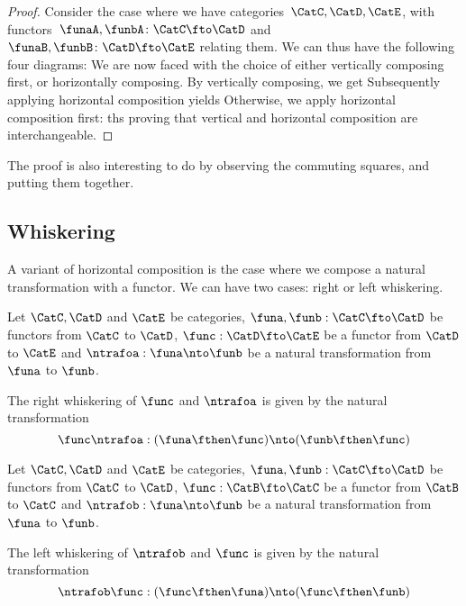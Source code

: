 \begin{proof}
    Consider the case where we have categories~$\CatC, \CatD, \CatE$, with functors~$\funaA, \funbA\colon\CatC \fto \CatD$ and~$\funaB, \funbB\colon\CatD \fto \CatE$ relating them.
    We can thus have the following four diagrams:
    We are now faced with the choice of either vertically composing first, or horizontally composing.
    By vertically composing, we get
    Subsequently applying horizontal composition yields
    Otherwise, we apply horizontal composition first:
    ths proving that vertical and horizontal composition are interchangeable.
\end{proof}

\begin{remark}
    The proof is also interesting to do by observing the commuting squares, and putting them together.
\end{remark}
\subsection{Whiskering}
A variant of horizontal composition is the case where we compose a natural transformation with a functor.
We can have two cases:
right or left whiskering.


\begin{ctdefinition}
    Let $\CatC, \CatD$ and $\CatE$ be categories, $\funa, \funb: \CatC \fto \CatD$ be functors from $\CatC$ to $\CatD$, $\func:\CatD \fto \CatE$ be a functor
    from $\CatD$ to $\CatE$ and $\ntrafoa:\funa \nto \funb$ be a natural transformation from $\funa$ to $\funb$.

    The right whiskering of $\func$ and $\ntrafoa$ is given by the natural transformation
    \begin{equation}
        \func \ntrafoa : (\funa\fthen\func) \nto (\funb\fthen\func)
    \end{equation}
\end{ctdefinition}

\begin{ctdefinition}
    Let $\CatC, \CatD$ and $\CatE$ be categories, $\funa, \funb: \CatC \fto \CatD$ be functors from $\CatC$ to $\CatD$, $\func:\CatB \fto \CatC$ be a functor
    from $\CatB$ to $\CatC$ and $\ntrafob:\funa \nto \funb$ be a natural transformation from $\funa$ to $\funb$.

    The left whiskering of $\ntrafob$ and $\func$ is given by the natural transformation
    \begin{equation}
        \ntrafob \func: (\func\fthen\funa) \nto (\func\fthen\funb)
    \end{equation}
\end{ctdefinition}

